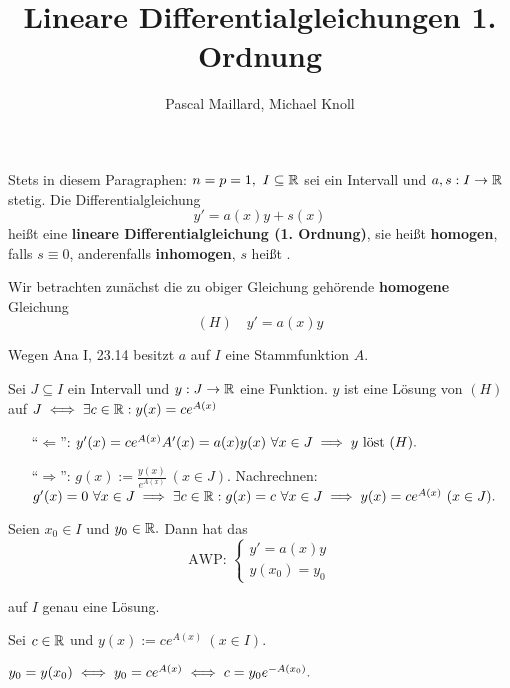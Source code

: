\documentclass{article}
\title{Lineare Differentialgleichungen 1. Ordnung}
\author{Pascal Maillard, Michael Knoll}
\begin{document}
\maketitle


Stets in diesem Paragraphen: $n=p=1,\ I\subseteq \MdR$ sei ein Intervall und $a,s:I\to\mathbb{R}$ stetig. Die Differentialgleichung $$y'=a(x)y+s(x)$$ heißt eine \textbf{lineare Differentialgleichung (1. Ordnung)}, sie heißt \textbf{homogen}, falls $s\equiv 0$, anderenfalls \textbf{inhomogen}, $s$ heißt .

Wir betrachten zunächst die zu obiger Gleichung gehörende \textbf{homogene} Gleichung $$(H)\quad y'=a(x)y$$

Wegen Ana I, 23.14 besitzt $a$ auf $I$ eine Stammfunktion $A$.

\begin{satz}
Sei $J\subseteq I$ ein Intervall und $y:J\to\mathbb{R}$ eine Funktion. $y$ ist eine Lösung von $(H)$ auf $J \iff \exists c\in\mathbb{R}:y(x)=ce^{A(x)}$
\end{satz}

\begin{beweis}
\begin{itemize}
\item["`$\Longleftarrow$"':] $y'(x)=ce^{A(x)}A'(x)=a(x)y(x)\ \forall x\in J \implies y\text{ löst }(H).$
\item["`$\Longrightarrow$"':] $g(x):=\frac{y(x)}{e^{A(x)}}\ (x\in J).$ Nachrechnen: $g'(x)=0\ \forall x\in J \implies \exists c\in\mathbb{R}:g(x)=c\ \forall x\in J \implies y(x)=ce^{A(x)}\ (x\in J).$
\end{itemize}
\end{beweis}

\begin{satz}
Seien $x_0\in I$ und $y_0\in\mathbb{R}.$ Dann hat das
$$\text{AWP: }\begin{cases}y'=a(x)y\\y(x_0)=y_0\end{cases}$$

auf $I$ genau eine Lösung.
\end{satz}

\begin{beweis}
Sei $c\in\mathbb{R}$ und $y(x):=ce^{A(x)}\ (x\in I).$

$y_0=y(x_0) \iff y_0=ce^{A(x)} \iff c=y_0e^{-A(x_0)}.$
\end{beweis}
\end{document}
